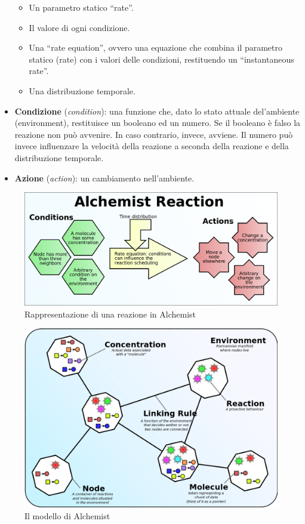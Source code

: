 \begin{itemize}
    \begin{itemize}
        \item Un parametro statico ``rate''.
        \item Il valore di ogni condizione.
        \item Una ``rate equation'', ovvero una equazione che combina il parametro statico (rate) con i valori delle condizioni, restituendo un ``instantaneous rate''.
        \item Una distribuzione temporale.
    \end{itemize}
    \item \textbf{Condizione} (\textit{condition}): una funzione che, dato lo stato attuale del'ambiente (environment), restituisce un booleano ed un numero. Se il booleano è falso la reazione non può avvenire. In caso contrario, invece, avviene. Il numero può invece influenzare la velocità della reazione a seconda della reazione e della distribuzione temporale.
    \item \textbf{Azione} (\textit{action}): un cambiamento nell'ambiente.
\end{itemize}

\begin{figure}[ht]
    \centering
    \includegraphics[width=.8\linewidth]{figures/alchemistReaction.png}
    \caption{Rappresentazione di una reazione in Alchemist}\label{fig:reactionAlchemist}
\end{figure}
\begin{figure}[ht]
    \centering
    \includegraphics[width=.8\linewidth]{figures/alchemistModel.png}
    \caption{Il modello di Alchemist}\label{fig:rmodelAlchemist}
\end{figure}
\clearpage




